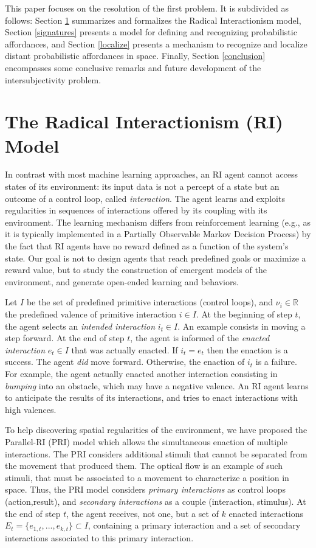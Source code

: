 \documentclass[conference]{IEEEtran}
\makeatletter
\let\cite\relax
\DeclareRobustCommand{\cite}{%
	\let\new@cite@pre\@gobble
	\@ifnextchar[\new@cite{\@citex[]}}
\def\new@cite[#1]{\@ifnextchar[{\new@citea{#1}}{\@citex[#1]}}
\def\new@citea#1{\def\new@cite@pre{#1}\@citex}
\makeatother
\begin{document}
This paper focuses on the resolution of the first problem. 
It is subdivided as follows: Section \ref{RI} summarizes and formalizes the Radical Interactionism model, Section \ref{signatures} presents a model for defining and recognizing probabilistic affordances, and Section \ref{localize} presents a mechanism to recognize and localize distant probabilistic affordances in space. Finally, Section \ref{conclusion} encompasses some conclusive remarks and future development of the intersubjectivity problem.




\section{The Radical Interactionism (RI) Model}\label{RI}

In contrast with most machine learning approaches, an RI agent cannot access states of its environment: its input data is not a percept of a state but an outcome of a control loop, called \textit{interaction}.
The agent learns and exploits regularities in sequences of interactions offered by its coupling with its environment.
The learning mechanism differs from reinforcement learning (e.g., as it is typically implemented in a Partially Observable Markov Decision Process) by the fact that RI agents have no reward defined as a function of the system's state.
Our goal is not to design agents that reach predefined goals or maximize a reward value, but to study the construction of emergent models of the environment, and generate open-ended learning and behaviors.

Let $I$ be the set of predefined primitive interactions (control loops), and $\nu_i \in \mathbb{R}$ the predefined valence of primitive interaction $i \in I$.
At the beginning of step $t$, the agent selects an \textit{intended interaction} $i_t \in I$.
An example consists in moving a step forward.
At the end of step $t$, the agent is informed of the \textit{enacted interaction} $e_t \in I$ that was actually enacted. 
If $i_t = e_t$ then the enaction is a success. 
The agent \textit{did} move forward.
Otherwise, the enaction of $i_t$ is a failure.
For example, the agent actually enacted another interaction consisting in \textit{bumping} into an obstacle, which may have a negative valence.
An RI agent learns to anticipate the results of its interactions, and tries to enact interactions with high valences.

To help discovering spatial regularities of the environment, we have proposed the Parallel-RI (PRI) model \cite{gay:space} which allows the simultaneous enaction of multiple interactions.
The PRI considers additional stimuli that cannot be separated from the movement that produced them. The optical flow is an example of such stimuli, that must be associated to a movement to characterize a position in space. Thus, the PRI model considers \textit{primary interactions} as control loops (action,result), and \textit{secondary interactions} as a couple (interaction, stimulus).
At the end of step $t$, the agent receives, not one, but a set of $k$ enacted interactions $E_t=\{e_{1,t},..., e_{k,t}\} \subset I$, containing a primary interaction and a set of secondary interactions associated to this primary interaction.
\end{document}
